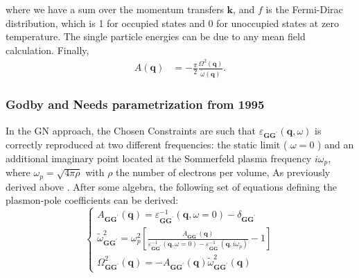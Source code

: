 where we have a sum over the momentum transfers $\mathbf{k}$, and $f$ is the Fermi-Dirac distribution, which is 1 for occupied states and 0 for unoccupied states at zero temperature. The single particle energies can be due to any mean field calculation. Finally,
\begin{align}
A(\mathbf{q}) &= -\frac{\pi}{2} \frac{\Omega^2(\mathbf{q})}{\tilde{\omega}(\mathbf{q})}.
\end{align}
\subsubsection{Godby and Needs parametrization from 1995}
In the GN approach, the Chosen Constraints are such  that $\varepsilon_{\boldsymbol{G} \boldsymbol{G}^{\prime}}(\boldsymbol{q}, \omega)$ is correctly reproduced at two different frequencies: the static limit ( $\omega=0$ ) and an additional imaginary point located at the Sommerfeld plasma frequency $i \omega_p$, where $\omega_p=\sqrt{4 \pi \rho}$ with $\rho$ the number of electrons per volume, As previously derived above . After some algebra, the following set of equations defining the plasmon-pole coefficients can be derived:
$$
\left\{\begin{array}{l}
A_{\boldsymbol{G} \boldsymbol{G}^{\prime}}(\boldsymbol{q})=\varepsilon_{\boldsymbol{G} \boldsymbol{G}^{\prime}}^{-1}(\boldsymbol{q}, \omega=0)-\delta_{\boldsymbol{G} \boldsymbol{G}^{\prime}} \\
\tilde{\omega}_{\boldsymbol{G} \boldsymbol{G}^{\prime}}^2=\omega_p^2\left[\frac{A_{\boldsymbol{G} \boldsymbol{G}^{\prime}}(\boldsymbol{q})}{\varepsilon_{\boldsymbol{G} \boldsymbol{G}^{\prime}}^{-1}(\boldsymbol{q}, \omega=0)-\varepsilon_{\boldsymbol{G} \boldsymbol{G}^{\prime}}^{-1}\left(\boldsymbol{q}, i \omega_p\right)}-1\right] \\
\Omega_{\boldsymbol{G} \boldsymbol{G}^{\prime}}^2(\boldsymbol{q})=-A_{\boldsymbol{G} \boldsymbol{G}^{\prime}}(\boldsymbol{q}) \tilde{\omega}_{\boldsymbol{G} \boldsymbol{G}^{\prime}}^2(\boldsymbol{q})
\end{array}\right.
$$

